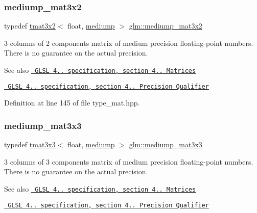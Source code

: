 \subsubsection{\texorpdfstring{mediump\_mat3x2}{mediump\_mat3x2}}
{\footnotesize\ttfamily typedef \mbox{\hyperlink{structglm_1_1tmat3x2}{tmat3x2}}$<$ float, \mbox{\hyperlink{namespaceglm_a0f04f086094c747d227af4425893f545a6416f3ea0c9025fb21ed50c4d6620482}{mediump}} $>$ \mbox{\hyperlink{group__core__precision_ga2237b9bb71ea5b0d2ae07f9315ccdc28}{glm\+::mediump\+\_\+mat3x2}}}

3 columns of 2 components matrix of medium precision floating-\/point numbers. There is no guarantee on the actual precision.

\begin{DoxySeeAlso}{See also}
\href{http://www.opengl.org/registry/doc/GLSLangSpec.4.20.8.pdf}{\texttt{ G\+L\+SL 4.. specification, section 4.. Matrices}} 

\href{http://www.opengl.org/registry/doc/GLSLangSpec.4.20.8.pdf}{\texttt{ G\+L\+SL 4.. specification, section 4.. Precision Qualifier}} 
\end{DoxySeeAlso}


Definition at line 145 of file type\+\_\+mat.\+hpp.

\mbox{\label{group__core__precision_gae75115c4c4608fccf6827f7a25d95885}} 
\subsubsection{\texorpdfstring{mediump\_mat3x3}{mediump\_mat3x3}}
{\footnotesize\ttfamily typedef \mbox{\hyperlink{structglm_1_1tmat3x3}{tmat3x3}}$<$ float, \mbox{\hyperlink{namespaceglm_a0f04f086094c747d227af4425893f545a6416f3ea0c9025fb21ed50c4d6620482}{mediump}} $>$ \mbox{\hyperlink{group__core__precision_gae75115c4c4608fccf6827f7a25d95885}{glm\+::mediump\+\_\+mat3x3}}}

3 columns of 3 components matrix of medium precision floating-\/point numbers. There is no guarantee on the actual precision.

\begin{DoxySeeAlso}{See also}
\href{http://www.opengl.org/registry/doc/GLSLangSpec.4.20.8.pdf}{\texttt{ G\+L\+SL 4.. specification, section 4.. Matrices}} 

\href{http://www.opengl.org/registry/doc/GLSLangSpec.4.20.8.pdf}{\texttt{ G\+L\+SL 4.. specification, section 4.. Precision Qualifier}} 
\end{DoxySeeAlso}


